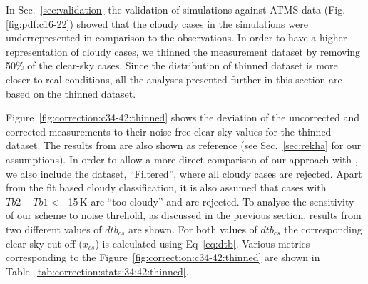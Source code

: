 \documentclass[12pt]{article}
\begin{document}
In Sec.~\ref{sec:validation} the validation of simulations against ATMS data
(Fig.\ref{fig:pdf:c16-22}) showed that the cloudy cases in the simulations were
underrepresented in comparison to the observations. In order to have a higher
representation of cloudy cases, we thinned the measurement dataset by removing
50\% of the clear-sky cases. Since the distribution of thinned dataset is more closer to real conditions, all the analyses presented further in this section are based on the thinned dataset. 



Figure~\ref{fig:correction:c34-42:thinned} shows the deviation of the uncorrected and
corrected measurements to their noise-free clear-sky values for the thinned dataset. The results from
\cite{rekha2012potential} are also shown as reference (see Sec.~\ref{sec:rekha}
for our assumptions). In order to allow a more direct comparison of our
approach with \cite{rekha2012potential}, we also include the
dataset, ``Filtered'', where all cloudy cases are rejected. Apart from the fit
based cloudy classification, it is also assumed that cases with $Tb2-Tb1 < $
-15\,K are ``too-cloudy'' and are rejected.  To analyse the sensitivity of our scheme to noise threhold, as discussed in the previous section, results from two different values of $dtb_{cs}$ are shown. For both values of $dtb_{cs}$ the corresponding clear-sky cut-off
($x_{cs}$) is calculated using Eq~\ref{eq:dtb}. Various metrics corresponding to
the Figure~\ref{fig:correction:c34-42:thinned} are shown in
Table~\ref{tab:correction:stats:34:42:thinned}.
\end{document}
